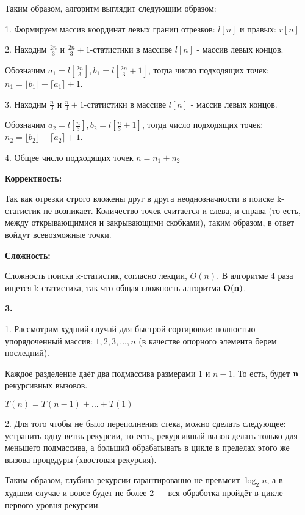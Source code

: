 \documentclass[12pt]{extreport}
\begin{document}
Таким образом, алгоритм выглядит следующим образом: 

1. Формируем массив координат левых границ отрезков: $l[n]$ и правых: $r[n]$ 

2. Находим $\frac{2n}{3}$ и $ \frac{2n}{3} + 1$-статистики в массиве $l[n]$ - массив левых концов. 

Обозначим $a_1 = l[\frac{2n}{3}], b_1 = l[\frac{2n}{3} + 1]$, тогда число подходящих точек: $n_1 = \lfloor b_1 \rfloor - \lceil a_1 \rceil + 1$.

3. Находим $\frac{n}{3} $ и $ \frac{n}{3} +1$-статистики в массиве $l[n]$ - массив левых концов. 

Обозначим $a_2 = l[\frac{n}{3}], b_2 = l[\frac{n}{3} +1]$, тогда число подходящих точек: $n_2 = \lfloor b_2 \rfloor - \lceil a_2 \rceil + 1$.

4. Общее число подходящих точек $n = n_1 + n_2$

\bigskip 
{\bf Корректность:}

Так как отрезки строго вложены друг в друга неоднозначности в поиске k-статистик не возникает. Количество точек считается и слева, и справа (то есть, между открывающимися и закрывающими скобками), таким образом, в ответ войдут всевозможные точки. 

\bigskip 
{\bf Сложность:} 

Сложность поиска k-статистик, согласно лекции, $O(n)$. В алгоритме 4 раза ищется k-статистика, так что общая сложность алгоритма $\bf{O(n)}$.

\bigskip 

{\bf 3.} 

1. Рассмотрим худший случай для быстрой сортировки: полностью упорядоченный массив: $1, 2, 3, ..., n$ (в качестве опорного элемента берем последний). 

Каждое разделение даёт два подмассива размерами 1 и $n-1$. То есть, будет $\bf {n}$ рекурсивных вызовов. 

$T(n) = T(n-1) + ... + T(1)$

2. Для того чтобы не было переполнения стека, можно сделать следующее: устранить одну ветвь рекурсии, то есть, рекурсивный вызов делать только для меньшего подмассива, а больший обрабатывать в цикле в пределах этого же вызова процедуры (хвостовая рекурсия). 

Таким образом, глубина рекурсии гарантированно не превысит $\log _{2}n$, а в худшем случае и вовсе будет не более 2 — вся обработка пройдёт в цикле первого уровня рекурсии. 

\bigskip 
\end{document}
